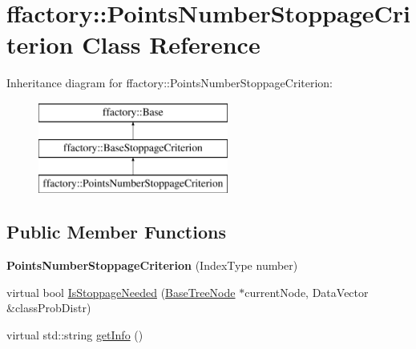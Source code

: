 \hypertarget{classffactory_1_1_points_number_stoppage_criterion}{\section{ffactory\-:\-:Points\-Number\-Stoppage\-Criterion Class Reference}
\label{classffactory_1_1_points_number_stoppage_criterion}
}
Inheritance diagram for ffactory\-:\-:Points\-Number\-Stoppage\-Criterion\-:\begin{figure}[H]
\begin{center}
\leavevmode
\includegraphics[height=3.000000cm]{classffactory_1_1_points_number_stoppage_criterion}
\end{center}
\end{figure}
\subsection*{Public Member Functions}
\begin{DoxyCompactItemize}
\item 
\hypertarget{classffactory_1_1_points_number_stoppage_criterion_a8fa11cdb675d833442af0924192d3ac6}{{\bfseries Points\-Number\-Stoppage\-Criterion} (Index\-Type number)}\label{classffactory_1_1_points_number_stoppage_criterion_a8fa11cdb675d833442af0924192d3ac6}

\item 
virtual bool \hyperlink{classffactory_1_1_points_number_stoppage_criterion_af92444c0b1627a64e82d64f3ee7268d4}{Is\-Stoppage\-Needed} (\hyperlink{classffactory_1_1_base_tree_node}{Base\-Tree\-Node} $\ast$current\-Node, Data\-Vector \&class\-Prob\-Distr)
\item 
virtual std\-::string \hyperlink{classffactory_1_1_points_number_stoppage_criterion_af8eaa4b922862c103528d9326115c74f}{get\-Info} ()
\end{DoxyCompactItemize}


